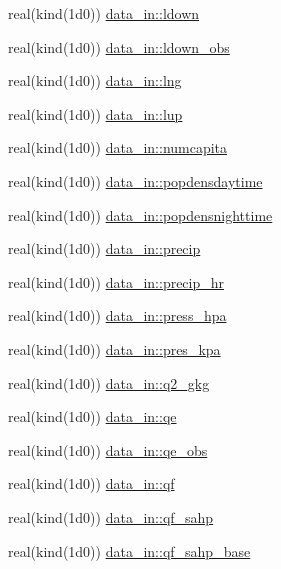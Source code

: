 \begin{DoxyCompactItemize}
\item 
real(kind(1d0)) \hyperlink{namespacedata__in_a7be43e97ab4efa32b57c8f6b6b5949b7}{data\+\_\+in\+::ldown}
\item 
real(kind(1d0)) \hyperlink{namespacedata__in_ad5a6e580db1d91b3cbb617a2bbee8d93}{data\+\_\+in\+::ldown\+\_\+obs}
\item 
real(kind(1d0)) \hyperlink{namespacedata__in_a3604b533bd06593307e185fbbee27efb}{data\+\_\+in\+::lng}
\item 
real(kind(1d0)) \hyperlink{namespacedata__in_a5a2c23ecc11fe337a954cca86be6e0ce}{data\+\_\+in\+::lup}
\item 
real(kind(1d0)) \hyperlink{namespacedata__in_a6121773c8a8acb40d4c9501422264e15}{data\+\_\+in\+::numcapita}
\item 
real(kind(1d0)) \hyperlink{namespacedata__in_a444b978c1a82b3eac7148ef35e9769c9}{data\+\_\+in\+::popdensdaytime}
\item 
real(kind(1d0)) \hyperlink{namespacedata__in_a6b29a851fa3dca9d854a9078a37ad349}{data\+\_\+in\+::popdensnighttime}
\item 
real(kind(1d0)) \hyperlink{namespacedata__in_affc86dfcf91974ff6d1768ff3b4406c3}{data\+\_\+in\+::precip}
\item 
real(kind(1d0)) \hyperlink{namespacedata__in_aa3e790835200b911e51eba62d37a0c43}{data\+\_\+in\+::precip\+\_\+hr}
\item 
real(kind(1d0)) \hyperlink{namespacedata__in_a03eea39f7275fe19868636524b857b6d}{data\+\_\+in\+::press\+\_\+hpa}
\item 
real(kind(1d0)) \hyperlink{namespacedata__in_a63dc6d1a7d5f10b5c3ebd45aaffb7150}{data\+\_\+in\+::pres\+\_\+kpa}
\item 
real(kind(1d0)) \hyperlink{namespacedata__in_a56c3960c55d29dadfd4d6be5ec53cc3c}{data\+\_\+in\+::q2\+\_\+gkg}
\item 
real(kind(1d0)) \hyperlink{namespacedata__in_a15dff170cc3ed5a26f5b095eebf80392}{data\+\_\+in\+::qe}
\item 
real(kind(1d0)) \hyperlink{namespacedata__in_a89bbf8e5d0059c1005799182e4f5f703}{data\+\_\+in\+::qe\+\_\+obs}
\item 
real(kind(1d0)) \hyperlink{namespacedata__in_a13eb3e18ed56b78668ba6c47d11ba155}{data\+\_\+in\+::qf}
\item 
real(kind(1d0)) \hyperlink{namespacedata__in_a3bdf6ad52d92cd85f212cea607807601}{data\+\_\+in\+::qf\+\_\+sahp}
\item 
real(kind(1d0)) \hyperlink{namespacedata__in_a717a1dc537f7b213fc70eb8f51819542}{data\+\_\+in\+::qf\+\_\+sahp\+\_\+base}

\end{DoxyCompactItemize}
